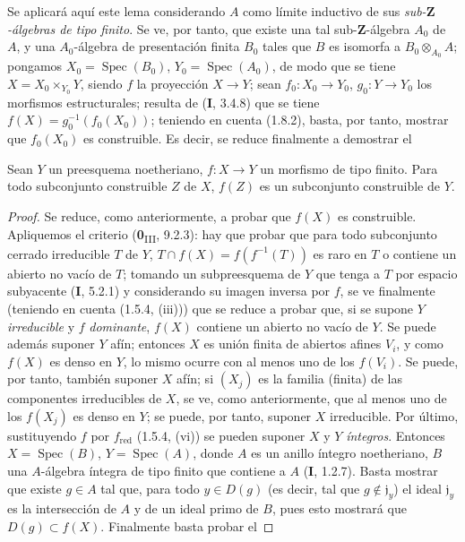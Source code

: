 Se aplicará aquí este lema considerando $A$ como límite inductivo de sus
\emph{sub-$\mathbf Z$-álgebras de tipo finito}. Se ve, por tanto, que existe una
tal sub-$\mathbf Z$-álgebra $A_0$ de $A$, y una $A_0$-álgebra de
presentación finita $B_0$ tales que $B$ es isomorfa a
$B_0\otimes_{A_0}A$; pongamos $X_0=\operatorname{Spec}(B_0)$,
$Y_0=\operatorname{Spec}(A_0)$, de modo que se tiene $X=X_0\times_{Y_0}Y$,
siendo $f$ la proyección $X\to Y$; sean $f_0:X_0\to Y_0$,
$g_0:Y\to Y_0$ los morfismos estructurales; resulta de (\textbf{I}, 3.4.8) que
se tiene $f(X)=g_0^{-1}(f_0(X_0))$; teniendo en cuenta (1.8.2), basta, por tanto,
mostrar que $f_0(X_0)$ es construible. Es decir, se reduce finalmente
a demostrar el

\begin{corollary}[1.8.5]
\label{IV.1.8.5-fr}
Sean $Y$ un preesquema noetheriano, $f:X\to Y$ un morfismo de tipo finito.
Para todo subconjunto construible $Z$ de $X$, $f(Z)$ es un subconjunto
construible de $Y$.
\end{corollary}


\begin{proof}
Se reduce, como anteriormente, a probar que $f(X)$ es construible.
Apliquemos el criterio (\textbf{0}\textsubscript{III}, 9.2.3): hay que probar que para
todo subconjunto cerrado irreducible $T$ de $Y$, $T\cap f(X)=f(f^{-1}(T))$ es
raro en $T$ o contiene un abierto no vacío de $T$; tomando un
subpreesquema de $Y$ que tenga a $T$ por espacio subyacente (\textbf{I}, 5.2.1) y
considerando su imagen inversa por $f$, se ve finalmente (teniendo en cuenta
(1.5.4, (iii))) que se reduce a probar que, si se supone $Y$
\emph{irreducible} y $f$ \emph{dominante}, $f(X)$ contiene un abierto no vacío de
$Y$. Se puede además suponer $Y$ afín; entonces $X$ es unión finita
de abiertos afines $V_i$, y como $f(X)$ es denso en $Y$, lo mismo ocurre
con al menos uno de los $f(V_i)$. Se puede, por tanto, también suponer $X$ afín; si
$(X_j)$ es la familia (finita) de las componentes irreducibles de $X$, se ve,
como anteriormente, que al menos uno de los $f(X_j)$ es denso en $Y$; se puede, por tanto,
suponer $X$ irreducible. Por último, sustituyendo $f$ por $f_{\mathrm{red}}$
(1.5.4, (vi)) se pueden suponer $X$ y $Y$ \emph{íntegros}. Entonces
$X=\operatorname{Spec}(B)$, $Y=\operatorname{Spec}(A)$, donde $A$ es un
anillo íntegro noetheriano, $B$ una $A$-álgebra íntegra de tipo finito que contiene
a $A$ (\textbf{I}, 1.2.7). Basta mostrar que existe $g\in A$ tal que, para todo
$y\in D(g)$ (es decir, tal que $g\notin\mathfrak j_y$) el ideal
$\mathfrak j_y$ es la intersección de $A$ y de un ideal primo de $B$, pues
esto mostrará que $D(g)\subset f(X)$. Finalmente basta probar el
\end{proof}

